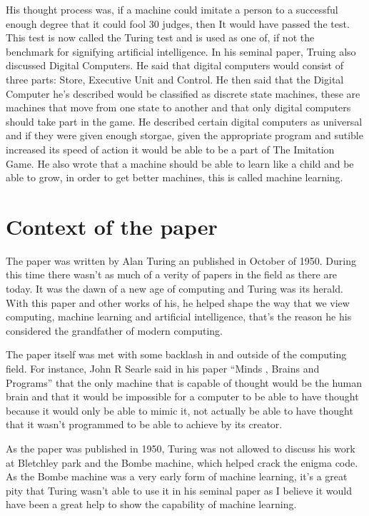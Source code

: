 \documentclass{article}
\begin{document}
His thought process was, if a machine could imitate a person to a successful enough degree that it could fool 30%
judges, then It would have passed the test. This test is now called the Turing test and is used as one of, if not the 
benchmark for signifying artificial intelligence. In his seminal paper, Truing also discussed Digital Computers. He 
said that digital computers would consist of three parts: Store, Executive Unit and Control. He then said that the 
Digital Computer he’s described would be classified as discrete state machines, these are machines that move from one 
state to another and that only digital computers should take part in the game. He described certain digital computers as 
universal and if they were given enough storgae, given the appropriate program and sutible increased its speed of action it would be able to be a part of The Imitation Game. He also wrote that a machine should be able to learn like a child and be able to grow, in order to get better machines, this is called machine learning.

\section{Context of the paper}

The paper was written by Alan Turing an published in October of 1950. During this time there wasn’t as much of a verity of 
papers in the field as there are today. It was the dawn of a new age of computing and Turing was its herald. With this paper 
and other works of his, he helped shape the way that we view computing, machine learning and artificial intelligence, that’s 
the reason he his considered the grandfather of modern computing. 

The paper itself was met with some backlash in and outside of the computing field. For instance, John R Searle said in his 
paper “Minds , Brains and Programs” that the only machine that is capable of thought would be the human brain and that it 
would be impossible for a computer to be able to have thought because it would only be able to mimic it, not actually be able 
to have thought that it wasn’t programmed to be able to achieve by its creator.

As the paper was published in 1950, Turing was not allowed to discuss his work at Bletchley park and the Bombe machine, which 
helped crack the enigma code. As the Bombe machine was a very early form of machine learning, it’s a great pity that Turing 
wasn’t able to use it in his seminal paper as I believe it would have been a great help to show the capability of machine 
learning. 
\end{document}
